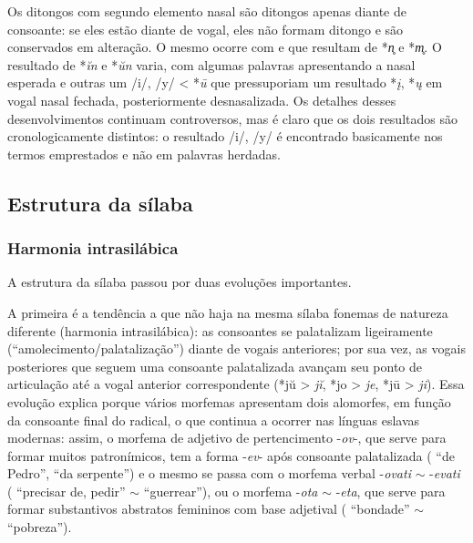 Os ditongos com segundo elemento nasal são ditongos apenas diante de consoante:
se eles estão diante de vogal, eles não formam ditongo e são conservados em
alteração. O mesmo ocorre com  e  que resultam de *\emph{n̥}
e *\emph{m̥}.
O resultado de *\emph{ĭn} e *\emph{ŭn} varia, com algumas palavras apresentando
a nasal esperada e outras um /i/, /y/ < *\emph{ū} que pressuporiam um resultado
*\emph{į}, *\emph{ų} em vogal nasal fechada, posteriormente desnasalizada.
Os detalhes desses desenvolvimentos continuam controversos, mas é claro que os
dois resultados são cronologicamente distintos: o resultado /i/, /y/ é
encontrado basicamente nos termos emprestados e não em palavras herdadas.


\subsection{Estrutura da sílaba}\label{sec:estruturasilabica}
\subsubsection{Harmonia intrasilábica}

A estrutura da sílaba passou por duas evoluções importantes.

A primeira é a tendência a que não haja na mesma sílaba fonemas de
natureza diferente (harmonia intrasilábica): as consoantes se
palatalizam ligeiramente (``amolecimento/palatalização'') diante de
vogais anteriores; por sua vez, as vogais posteriores que seguem uma
consoante palatalizada avançam seu ponto de articulação até a vogal
anterior correspondente (*jŭ > \emph{jĭ}, *jo
> \emph{je}, *jū > \emph{ji}).
Essa evolução explica porque vários morfemas apresentam dois alomorfes, em função da
consoante final do radical, o que continua a ocorrer nas línguas eslavas
modernas: assim, o morfema de adjetivo de pertencimento -\emph{ov}-, que
serve para formar muitos patronímicos, tem a forma -\emph{ev}- após
consoante palatalizada ( ``de Pedro'',
 ``da serpente'') e o mesmo se passa com o morfema verbal
-\emph{ovati} $\sim$ -\emph{evati} ( ``precisar
de, pedir'' $\sim$  ``guerrear''),
ou o morfema -\emph{ota} $\sim$ -\emph{eta}, que serve para
formar substantivos abstratos femininos com base adjetival
( ``bondade'' $\sim$ 
``pobreza'').

